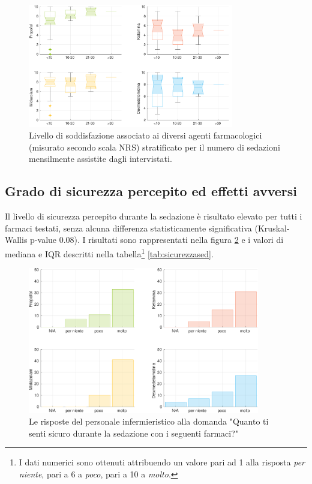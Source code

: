 \begin{figure}[!h]
    \centering
    \includegraphics[width=0.8\textwidth]{Figure/qualita-strat-frequenza.pdf}
    \caption{Livello di soddisfazione associato ai diversi agenti farmacologici (misurato secondo scala NRS) stratificato per il numero di sedazioni mensilmente assistite dagli intervistati.}
    \label{fig:qualitafrequenza}
\end{figure}

\newpage

\subsection*{Grado di sicurezza percepito ed effetti avversi}

Il livello di sicurezza percepito durante la sedazione è risultato elevato per tutti i farmaci testati, senza alcuna differenza statisticamente significativa (Kruskal-Wallis p-value 0.08). I risultati sono rappresentati nella figura \ref{fig:sicurezza} e i valori di mediana e IQR descritti nella tabella\footnote{I dati numerici sono ottenuti attribuendo un valore pari ad 1 alla risposta \emph{per niente}, pari a 6 a \emph{poco}, pari a 10 a \emph{molto}.} \ref{tab:sicurezzased}.

\begin{figure}[!h]
    \centering
    \includegraphics[width=0.9\textwidth]{Figure/sicurezza-istogrammi.pdf}
    \caption{Le risposte del personale infermieristico alla domanda "Quanto ti senti sicuro durante la sedazione con i seguenti farmaci?"}
    \label{fig:sicurezza}
\end{figure}

